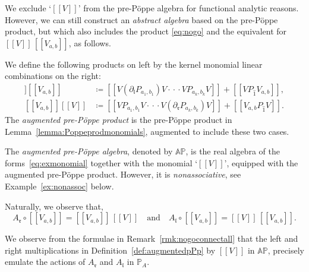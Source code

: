 \documentclass[5p,twocolumn]{elsarticle}
\newcommand*{\pa}{{\partial}}
\newcommand*{\lb}{[\![}
\newcommand*{\rb}{]\!]}
\newcommand*{\el}{\mathfrak l}
\newcommand*{\rl}{\mathfrak r}
\begin{document}
%
We exclude `$\lb V\rb$' from the pre-P\"oppe algebra for functional analytic reasons.
However, we can still construct an \emph{abstract algebra} based on the pre-P\"oppe product, but which also includes the product \eqref{eq:nogo} and the equivalent for $\lb V\rb\,\lb V_{a,b}\rb$, as follows.
%
\begin{definition}\label{def:augmentedpPp}
 We define the following products on left by the kernel monomial linear combinations on the right:  
 \begin{align*}
   \lb V\rb\lb V_{a,b}\rb&\coloneqq\lb V(\pa_{\el}P_{a_1,b_1})V\cdot\!\cdot\!\cdot VP_{a_k,b_k}V\rb+\lb VP_{\hat{1}}V_{a,b}\rb,\\
   \lb V_{a,b}\rb\lb V\rb&\coloneqq\lb VP_{a_1,b_1}V\cdot\!\cdot\!\cdot V(\pa_{\rl}P_{a_k,b_k})V\rb+\lb V_{a,b}P_{\hat{1}}V\rb. 
 \end{align*}
The \emph{augmented pre-P\"oppe product} is the pre-P\"oppe product in Lemma~\ref{lemma:Poppeprodmonomials}, augmented to include these two cases.
\end{definition}
%
\begin{definition}\label{def:ApPA}
  The \emph{augmented pre-P\"oppe algebra}, denoted by $\mathbb{AP}$, is the real algebra of the forms~\eqref{eq:exmonomial} together with the monomial `$\lb V\rb$',
  equipped with the augmented pre-P\"oppe product. However, it is \emph{nonassociative}, see Example~\ref{ex:nonassoc} below.
\end{definition}  
%
\begin{remark}\label{rmk:nogoconnectall}
  Naturally, we observe that,
  \begin{equation*}
    A_{\rl}\circ\lb V_{a,b}\rb=\lb V_{a,b}\rb\,\lb V\rb\quad\text{and}\quad A_{\el}\circ\lb V_{a,b}\rb=\lb V\rb\,\lb V_{a,b}\rb. 
  \end{equation*}  
\end{remark}
%
We observe from the formulae in Remark~\ref{rmk:nogoconnectall} that the left and right multiplications in Definition~\ref{def:augmentedpPp} by $\lb V\rb$ in $\mathbb{AP}$,
precisely emulate the actions of $A_{\rl}$ and $A_{\el}$ in $\mathbb{P}_A$.
%
\end{document}
